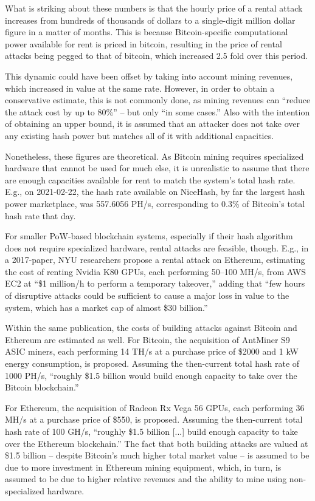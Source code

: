 What is striking about these numbers is that the hourly price of a rental attack increases from hundreds of thousands of dollars to a single-digit million dollar figure in a matter of months.
This is because Bitcoin-specific computational power available for rent is priced in bitcoin, resulting in the price of rental attacks being pegged to that of bitcoin, which increased 2.5 fold over this period.

This dynamic could have been offset by taking into account mining revenues, which increased in value at the same rate.
However, in order to obtain a conservative estimate, this is not commonly done, as mining revenues can ``reduce the attack cost by up to 80\%'' -- but only ``in some cases.'' \autocite{crypto512021about}
Also with the intention of obtaining an upper bound, it is assumed that an attacker does not take over any existing hash power but matches all of it with additional capacities.

Nonetheless, these figures are theoretical.
As Bitcoin mining requires specialized hardware that cannot be used for much else, it is unrealistic to assume that there are enough capacities available for rent to match the system's total hash rate.
E.g., on 2021-02-22, the hash rate available on NiceHash, by far the largest hash power marketplace, was 557.6056 PH/s, corresponding to 0.3\% of Bitcoin's total hash rate that day.

For smaller PoW-based blockchain systems, especially if their hash algorithm does not require specialized hardware, rental attacks are feasible, though.
E.g., in a 2017-paper, NYU researchers propose a rental attack on Ethereum, \autocite[95]{bonneau2013} estimating the cost of renting Nvidia K80 GPUs, each performing 50–100 MH/s, from AWS EC2 at ``\$1 million/h to perform a temporary takeover,'' adding that ``few hours of disruptive attacks could be sufficient to cause a major loss in value to the system, which has a market cap of almost \$30 billion.''

Within the same publication, the costs of building attacks against Bitcoin and Ethereum are estimated as well. \autocite[95, 96]{bonneau2013}
For Bitcoin, the acquisition of AntMiner S9 ASIC miners, each performing 14 TH/s at a purchase price of \$2000 and 1 kW energy consumption, is proposed.
Assuming the then-current total hash rate of 1000 PH/s, ``roughly \$1.5 billion would build enough capacity to take over the Bitcoin blockchain.''

For Ethereum, the acquisition of Radeon Rx Vega 56 GPUs, each performing 36 MH/s at a purchase price of \$550, is proposed.
Assuming the then-current total hash rate of 100 GH/s, ``roughly \$1.5 billion [...] build enough capacity to take over the Ethereum blockchain.''
The fact that both building attacks are valued at \$1.5 billion -- despite Bitcoin's much higher total market value -- is assumed to be due to more investment in Ethereum mining equipment, which, in turn, is assumed to be due to higher relative revenues and the ability to mine using non-specialized hardware. \autocite[96]{bonneau2013}

